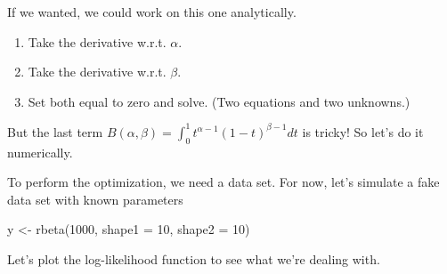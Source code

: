 \documentclass[
]{book}
\newenvironment{Shaded}{\begin{snugshade}}{\end{snugshade}}
\newcommand{\AttributeTok}[1]{\textcolor[rgb]{0.77,0.63,0.00}{#1}}
\newcommand{\DecValTok}[1]{\textcolor[rgb]{0.00,0.00,0.81}{#1}}
\newcommand{\FunctionTok}[1]{\textcolor[rgb]{0.00,0.00,0.00}{#1}}
\newcommand{\NormalTok}[1]{#1}
\newcommand{\OtherTok}[1]{\textcolor[rgb]{0.56,0.35,0.01}{#1}}
\providecommand{\tightlist}{%
  \setlength{\itemsep}{0pt}\setlength{\parskip}{0pt}}
\begin{document}
If we wanted, we could work on this one analytically.

\begin{enumerate}
\def\labelenumi{\arabic{enumi}.}
\tightlist
\item
  Take the derivative w.r.t. \(\alpha\).
\item
  Take the derivative w.r.t. \(\beta\).
\item
  Set both equal to zero and solve. (Two equations and two unknowns.)
\end{enumerate}

But the last term \(B(\alpha, \beta) = \int_0^1 t^{\alpha - 1}(1 - t)^{\beta - 1}dt\) is tricky! So let's do it numerically.

To perform the optimization, we need a data set. For now, let's simulate a fake data set with known parameters

\begin{Shaded}
\begin{Highlighting}[]
\NormalTok{y }\OtherTok{\textless{}{-}} \FunctionTok{rbeta}\NormalTok{(}\DecValTok{1000}\NormalTok{, }\AttributeTok{shape1 =} \DecValTok{10}\NormalTok{, }\AttributeTok{shape2 =} \DecValTok{10}\NormalTok{)}
\end{Highlighting}
\end{Shaded}

Let's plot the log-likelihood function to see what we're dealing with.
\end{document}
